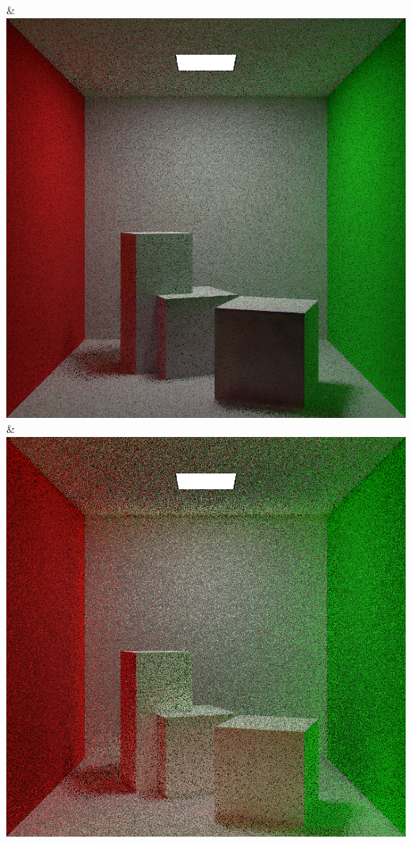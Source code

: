 & \includegraphics[width=\linewidth]{figures/py/tests/quality_comparison/nrc+pt_1spp.png}
& \includegraphics[width=\linewidth]{figures/py/tests/quality_comparison/nrc+pt+sl_1spp.png}

